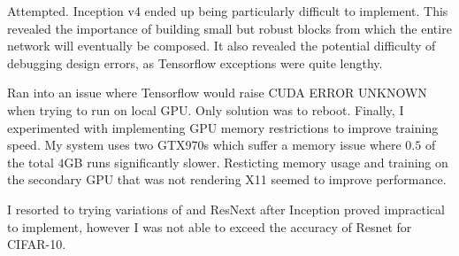 \documentclass[11pt]{article}
\begin{document}
\begin{solution}
\begin{comment}
		\draw[line] (in) -| (conv1);
		\draw[line] (in) -- (conv2-1);
		\draw[line] (in) -- (conv3-1);
		\draw[line] (in) -| (conv4-1);

		\draw[line] (conv2-1) -- (conv2-2);
		\draw[line] (conv3-1) -- (conv3-2);

		\draw[line] (conv4-1) -- (conv4-2);
		\draw[line] (conv4-2) -- (conv4-3);

		\draw[line] (conv1) -- (out);
		\draw[line] (conv2-2) -- (out);
		\draw[line] (conv3-2) -- (out);
		\draw[line] (conv4-3) -- (out);

	\end{tikzpicture}
	}
	\label{fig:red}
	\caption{Modified Inception v4 reductions}
\end{figure}
\end{comment}

\end{solution}
\begin{solution}
	Attempted. Inception v4 ended up being particularly difficult to implement.
	This revealed the importance of building small but robust blocks from which
	the entire network will eventually be composed. It also revealed the
	potential difficulty of debugging design errors, as Tensorflow exceptions
	were quite lengthy.
	\newline

	Ran into an issue where Tensorflow would raise \textsc{CUDA ERROR UNKNOWN}
	when trying to run on local GPU. Only solution was to reboot.
	Finally, I experimented with implementing GPU memory restrictions to
	improve training speed. My system uses two GTX970s which suffer a memory
	issue where $0.5$ of the total $4$GB runs significantly slower.
	Resticting memory usage and training on the secondary GPU that was not
	rendering X11 seemed to improve performance.
\end{solution}
\begin{solution}
	I resorted to trying variations of and ResNext after Inception proved
	impractical to implement, however I was not able to exceed the accuracy of
	Resnet for CIFAR-10.
\end{solution}
\end{document}
